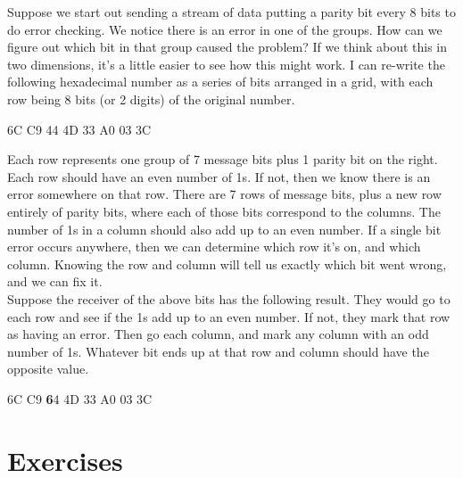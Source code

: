 Suppose we start out sending a stream of data putting a parity bit every 8 bits to do error checking. We notice there is an error in one of the groups. How can we figure out which bit in that group caused the problem? If we think about this in two dimensions, it's a little easier to see how this might work. I can re-write the following hexadecimal number as a series of bits arranged in a grid, with each row being 8 bits (or 2 digits) of the original number.\\

\begin{center}6C C9 44 4D 33 A0 03 3C\end{center}

\begin{center}\end{center}

Each row represents one group of 7 message bits plus 1 parity bit on the right. Each row should have an even number of 1s. If not, then we know there is an error somewhere on that row. There are 7 rows of message bits, plus a new row entirely of parity bits, where each of those bits correspond to the columns. The number of 1s in a column should also add up to an even number. If a single bit error occurs anywhere, then we can determine which row it's on, and which column. Knowing the row and column will tell us exactly which bit went wrong, and we can fix it.\\

Suppose the receiver of the above bits has the following result. They would go to each row and see if the 1s add up to an even number. If not, they mark that row as having an error. Then go each column, and mark any column with an odd number of 1s. Whatever bit ends up at that row and column should have the opposite value.

\begin{center}6C C9 \textbf{6}4 4D 33 A0 03 3C\end{center}

\begin{center}\end{center}


\section{Exercises}

